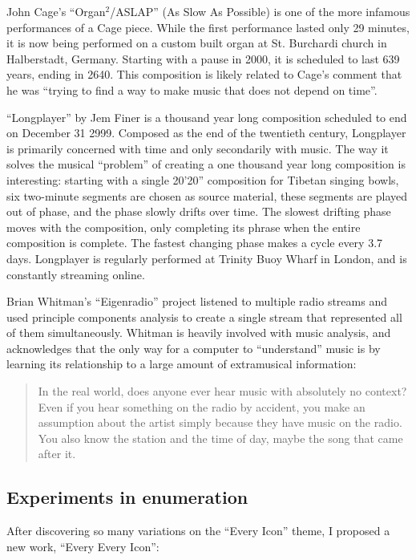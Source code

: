 \documentclass{thesis}
\begin{document}
	John Cage's ``Organ$^2$/ASLAP'' (As Slow As Possible)\cite{john_cage_as_????} is one of the more infamous performances of a Cage piece. While the first performance lasted only 29 minutes, it is now being performed on a custom built organ at St. Burchardi church in Halberstadt, Germany. Starting with a pause in 2000, it is scheduled to last 639 years, ending in 2640. This composition is likely related to Cage's comment that he was ``trying to find a way to make music that does not depend on time''.
	
	``Longplayer'' by Jem Finer\cite{jem_finer_longplayer_????} is a thousand year long composition scheduled to end on December 31 2999. Composed as the end of the twentieth century, Longplayer is primarily concerned with time and only secondarily with music. The way it solves the musical ``problem'' of creating a one thousand year long composition is interesting: starting with a single 20'20'' composition for Tibetan singing bowls, six two-minute segments are chosen as source material, these segments are played out of phase, and the phase slowly drifts over time. The slowest drifting phase moves with the composition, only completing its phrase when the entire composition is complete. The fastest changing phase makes a cycle every 3.7 days. Longplayer is regularly performed at Trinity Buoy Wharf in London, and is constantly streaming online.
	
	Brian Whitman's ``Eigenradio''\cite{brian_whitman_eigenradio_2005} project listened to multiple radio streams and used principle components analysis to create a single stream that represented all of them simultaneously. Whitman is heavily involved with music analysis, and acknowledges that the only way for a computer to ``understand'' music is by learning its relationship to a large amount of extramusical information:
	
	\begin{quote}
	In the real world, does anyone ever hear music with absolutely no context? Even if you hear something on the radio by accident, you make an assumption about the artist simply because they have music on the radio. You also know the station and the time of day, maybe the song that came after it.
	\end{quote}
		
\subsection{Experiments in enumeration}

	After discovering so many variations on the ``Every Icon'' theme, I proposed a new work, ``Every Every Icon'':
	
\end{document}
